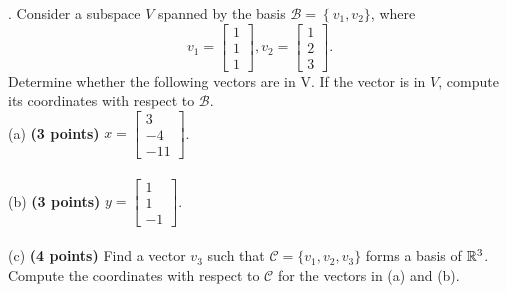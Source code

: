 \documentclass[12pt,a4paper]{article}
\newcommand{\gray}[1]{\textcolor{gray}{}}
\renewcommand{\l}{\left}
\renewcommand{\r}{\right}
\def\R{\ifmmode\mathbb R\fi}
\begin{document}
\newpage
{}. Consider a subspace $V$ spanned by the basis $\mathcal B = \l\{v_1, v_2\}$, where
$$v_1 =
    \l[
    \begin{array}{c}
	1\\ 1\\ 1
    \end{array}
    \r],  v_2 =
    \l[
    \begin{array}{c}
	1\\ 2\\ 3
    \end{array}
    \r]
.$$
Determine whether the following vectors are in V. If the vector is in $V$, compute its coordinates with respect to $\mathcal B$.\\ 
(a) \textbf{(3 points)} $x = \l[
\begin{array}{c}
    3\\ -4 \\ -11
\end{array}\r]$. \\
\\
(b) \textbf{(3 points)} $y = \l[
\begin{array}{c}
    1\\ 1\\ -1
\end{array}\r]$. \\
\\
(c) \textbf{(4 points)} Find a vector $v_3$ such that $\mathcal C = \{v_1, v_2, v_3\}$ forms a basis of $\R^3$. Compute the coordinates with respect to $\mathcal C$ for the vectors in (a) and (b). \\
\\
\gray{
    (a) $x = 10v_1 - 7 v_2$, and $[x]_{\mathcal B} = (10, -7)$. \\
    \\
    (b) $y = 2v_1 - v_2 + (0, 1, 0)$, and $y \notin V$. \\
    \\
    (c) Let $v_3 = (0, 1, 0)$, then $[x]_{\mathcal C} = (10, -7, 0), [y]_{\mathcal C} = (2, -1, 1)$.
}
\end{document}
